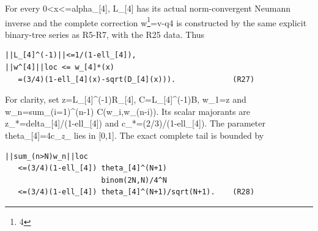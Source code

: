 \documentclass[11pt,a4paper]{article}
\renewcommand{\[}{\begingroup\small\originaldisplaystart}
\renewcommand{\]}{\originaldisplayend\endgroup}
\begin{document}
For every 0\textless x\textless=alpha\_{[}4{]}, L\_{[}4{]} has its
actual norm-convergent Neumann inverse and the complete correction
w\footnote{4}=v-q4 is constructed by the same explicit binary-tree
series as R5-R7, with the R25 data. Thus

\begin{verbatim}
||L_[4]^(-1)||<=1/(1-ell_[4]),
||w^[4]||loc <= w_[4]*(x)
   =(3/4)(1-ell_[4](x)-sqrt(D_[4](x))).             (R27)
\end{verbatim}

For clarity, set z=L\_{[}4{]}\^{}(-1)R\_{[}4{]}, C=L\_{[}4{]}\^{}(-1)B,
w\_1=z and
{\ttfamily w\allowbreak{}\_\allowbreak{}n\allowbreak{}=\allowbreak{}s\allowbreak{}u\allowbreak{}m\allowbreak{}\_\allowbreak{}(\allowbreak{}i\allowbreak{}=\allowbreak{}1\allowbreak{})\allowbreak{}\textasciicircum{}\allowbreak{}(\allowbreak{}n\allowbreak{}-\allowbreak{}1\allowbreak{})\allowbreak{} \allowbreak{}C\allowbreak{}(\allowbreak{}w\allowbreak{}\_\allowbreak{}i\allowbreak{},\allowbreak{}w\allowbreak{}\_\allowbreak{}(\allowbreak{}n\allowbreak{}-\allowbreak{}i\allowbreak{})\allowbreak{})\allowbreak{}}.
Its scalar majorants are
{\ttfamily z\allowbreak{}\_\allowbreak{}*\allowbreak{}=\allowbreak{}d\allowbreak{}e\allowbreak{}l\allowbreak{}t\allowbreak{}a\allowbreak{}\_\allowbreak{}[\allowbreak{}4\allowbreak{}]\allowbreak{}/\allowbreak{}(\allowbreak{}1\allowbreak{}-\allowbreak{}e\allowbreak{}l\allowbreak{}l\allowbreak{}\_\allowbreak{}[\allowbreak{}4\allowbreak{}]\allowbreak{})\allowbreak{}}
and
{\ttfamily c\allowbreak{}\_\allowbreak{}*\allowbreak{}=\allowbreak{}(\allowbreak{}2\allowbreak{}/\allowbreak{}3\allowbreak{})\allowbreak{}/\allowbreak{}(\allowbreak{}1\allowbreak{}-\allowbreak{}e\allowbreak{}l\allowbreak{}l\allowbreak{}\_\allowbreak{}[\allowbreak{}4\allowbreak{}]\allowbreak{})\allowbreak{}}.
The parameter theta\_{[}4{]}=4c\_\emph{z\_} lies in {[}0,1{]}. The exact
complete tail is bounded by

\begin{verbatim}
||sum_(n>N)w_n||loc
   <=(3/4)(1-ell_[4]) theta_[4]^(N+1)
                      binom(2N,N)/4^N
   <=(3/4)(1-ell_[4]) theta_[4]^(N+1)/sqrt(N+1).    (R28)
\end{verbatim}
\end{document}
